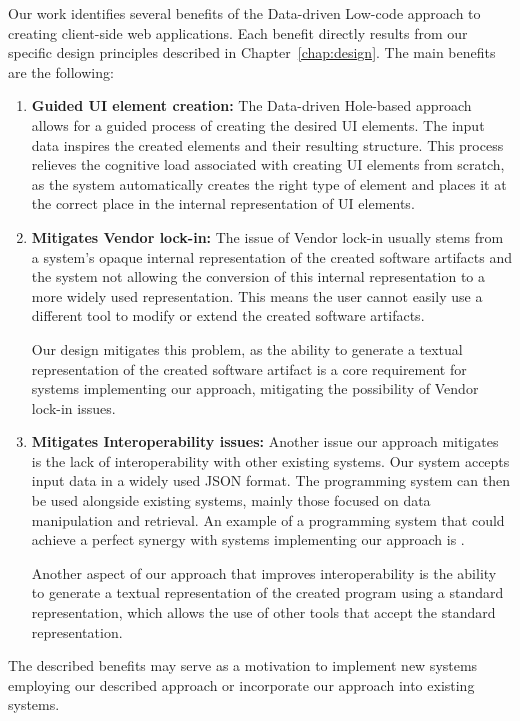 Our work identifies several benefits of the Data-driven Low-code approach to creating client-side web applications.
Each benefit directly results from our specific design principles described in Chapter~\ref{chap:design}.
The main benefits are the following:
\begin{enumerate}
	\item \textbf{Guided UI element creation:} The Data-driven Hole-based approach allows for a guided process of creating the desired UI elements.
	      The input data inspires the created elements and their resulting structure.
	      This process relieves the cognitive load associated with creating UI elements from scratch, as the system automatically creates the right type
	      of element and places it at the correct place in the internal representation of UI elements.

	\item \textbf{Mitigates Vendor lock-in:} The issue of Vendor lock-in usually stems from a system's opaque internal representation of the created software artifacts
	      and the system not allowing the conversion of this internal representation to a more widely used representation.
	      This means the user cannot easily use a different tool to modify or extend the created software artifacts.

	      Our design mitigates this problem, as the ability to generate a textual representation of the created software artifact is a core requirement
	      for systems implementing our approach, mitigating the possibility of Vendor lock-in issues.

	\item \textbf{Mitigates Interoperability issues:}
	      Another issue our approach mitigates is the lack of interoperability with other existing systems.
	      Our system accepts input data in a widely used JSON format.
	      The programming system can then be used alongside existing systems, mainly those focused on data manipulation and retrieval.
	      An example of a programming system that could achieve a perfect synergy with systems implementing our approach is \citet{graphql}.

	      Another aspect of our approach that improves interoperability is the ability to generate a textual representation of the created program using a standard representation, which allows the use of other tools that accept the standard representation.
\end{enumerate}

The described benefits may serve as a motivation to implement new systems employing our described approach or incorporate our approach into existing systems.

